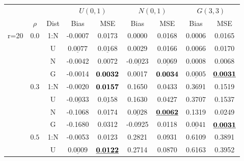 \documentclass[12pt]{article}
\newcommand{\ul}{\underline}
\begin{document}
\begin{table}[htp!]
\begin{center} \scriptsize{
	\begin{tabular}{|c|c|c|c|c|c|c|c|c| }
        \hline
        & &&\multicolumn{2}{|c|}{$U(0,1)$}&\multicolumn{2}{|c|}{$N(0,1)$}& \multicolumn{2}{|c|}{$G(3,3)$}\\
          \cline{2-9}
&		$\rho$&Dist &  Bias & MSE & Bias & MSE & Bias   & MSE  \\
         \hline
   \multirow{15}{1cm}{r=20}&       $0.0$&1:N&    -0.0007  & 0.0173  & 0.0000  & 0.0168 & 0.0006  & 0.0165  \\
        &   &U&$\ul{    0.0077}$  &$\ul{ 0.0168}$  & 0.0029  & 0.0166 & 0.0066  & 0.0170  \\
	&	   &N&    -0.0042  & 0.0072  &-$\ul{0.0023}$  &$\ul{ 0.0069}$ & 0.0008  & 0.0068  \\
	&	   &G&    -0.0014  &${\bf 0.0032}$  & 0.0017  &${\bf 0.0034}$ &$\ul{ 0.0005}$  &${\bf\ul{ 0.0031}}$  \\
        \cline{2-9}
       &  $0.3$&1:N&    -0.0020  &${\bf 0.0157}$  & 0.1650  & 0.0433 & 0.3691  & 0.1519    \\
	&	   &U&-$\ul{0.0033}$  &$\ul{ 0.0158}$  & 0.1630  & 0.0427 & 0.3707  & 0.1537    \\
	&	   &N&    -0.1068  & 0.0174  &$\ul{ 0.0028}$  &${\bf\ul{ 0.0062}}$ & 0.1319  & 0.0249    \\
	&	   &G&    -0.1680  & 0.0312  & -0.0925  & 0.0118 &$\ul{ 0.0041}$  &${\bf\ul{ 0.0031}}$  \\
	\cline{2-9}
	&	 $0.5$&1:N&    -0.0053  & 0.0123  & 0.2821  & 0.0931  & 0.6109  & 0.3891    \\
	&	   &U&$\ul{    0.0009}$  &${\bf\ul{ 0.0122}}$  & 0.2714 & 0.0870 & 0.6163 &	0.3952  \\

\end{tabular}}
\end{center}
\end{table}
\end{document}
